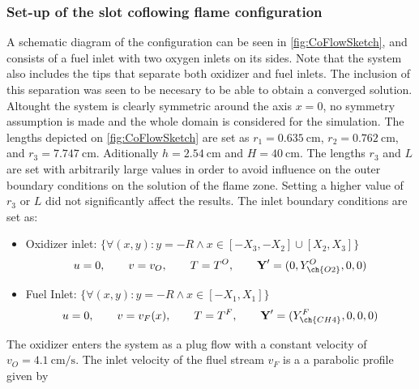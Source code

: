 \subsubsection{Set-up of the slot coflowing flame configuration}
A schematic diagram of the configuration can be seen in \cref{fig:CoFlowSketch}, and consists of a fuel inlet with two oxygen inlets on its sides. Note that the system also includes the tips that separate both oxidizer and fuel inlets. The inclusion of this separation was seen to be necesary to be able to obtain a converged solution. Altought the system is clearly symmetric around the axis $x = 0$, no symmetry assumption is made and the whole domain is considered for the simulation. The lengths  depicted on \cref{fig:CoFlowSketch} are set as $r_1 = \SI{0.635}{\centi \meter}$, $r_2 = \SI{0.762}{\centi \meter}$, and $r_3 = \SI{7.747}{\centi \meter}$. Aditionally $h = \SI{2.54}{\centi \meter}$ and $H = \SI{40}{\centi \meter}$.  The lengths $r_3$ and $L$ are set with arbitrarily large values in order to avoid influence on the outer boundary conditions on the solution of the flame zone. Setting a higher value of $r_3$ or $L$ did not significantly affect the results.  %
The inlet boundary conditions are set as: 
\begin{itemize}
	\item Oxidizer inlet: $\{\forall (x,y): y = -R \land x \in [-X_3,-X_2]\cup[X_2,X_3]\}$\\
	\begin{equation*}
		u = 0,\qquad v= v_O, \qquad T = T^O, \qquad \vec{Y}' = (0,Y^O_{\ch{O2}},0,0)
	\end{equation*}
\item Fuel Inlet: $\{\forall (x,y): y = -R \land x \in [-X_1,X_1]\} $ \\
\begin{equation*}
	u = 0,\qquad v= v_F(x), \qquad T = T^F, \qquad \vec{Y}' = (Y^F_{\ch{CH4}},0,0,0)
\end{equation*}
\end{itemize}
The oxidizer enters the system as a plug flow with a constant velocity of $v_O = \SI{4.1}{\centi \meter \per \second}$. The inlet velocity of the fluel stream $v_F$ is a a parabolic profile given by
